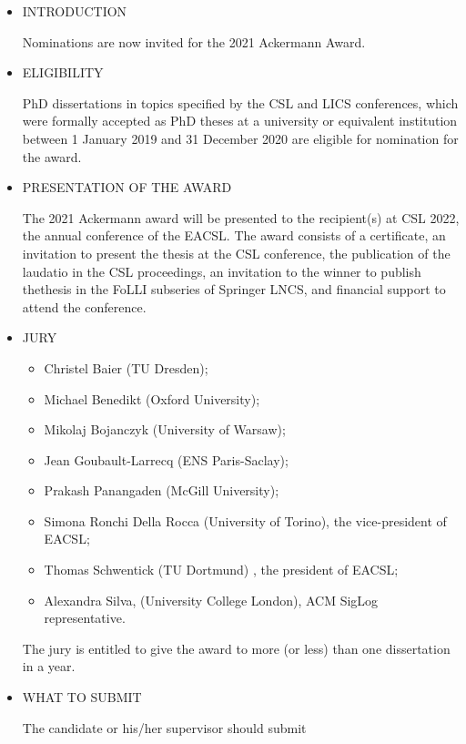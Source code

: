 \documentclass[prodmode,acmtecs]{acmsmall} %
\begin{document}
\begin{itemize}\item  INTRODUCTION 
 
  Nominations are now invited for the 2021 Ackermann Award. 
 
\item  ELIGIBILITY 
 
  PhD dissertations in topics specified by the CSL and LICS conferences, which were formally accepted as PhD theses at a university or equivalent institution between 1 January 2019 and 31 December 2020 are eligible for nomination for the award. 
 
\item  PRESENTATION OF THE AWARD  
 
  The 2021 Ackermann award will be presented to the recipient(s) at CSL 2022, the annual conference of the EACSL.  The award consists of a certificate, an invitation to present the thesis at the CSL conference, the publication of the laudatio in the CSL proceedings, an invitation to the winner to publish thethesis in the FoLLI subseries of Springer LNCS, and  financial support to attend the conference. 
 
\item  JURY 
 
\begin{itemize}\item  Christel Baier (TU Dresden);
\item  Michael Benedikt (Oxford University);
\item  Mikolaj Bojanczyk (University of Warsaw);
\item  Jean Goubault-Larrecq (ENS Paris-Saclay);
\item  Prakash Panangaden (McGill University);
\item  Simona Ronchi Della Rocca (University of Torino), the vice-president of EACSL;
\item  Thomas Schwentick (TU Dortmund) , the president of EACSL;
\item  Alexandra Silva, (University College London), ACM SigLog representative.
\end{itemize} 
 The jury is entitled to give the award to more (or less) than one dissertation in a year. 
 
\item  WHAT TO SUBMIT 
 
  The candidate or his/her supervisor should submit 
 

\end{itemize}
\end{document}
